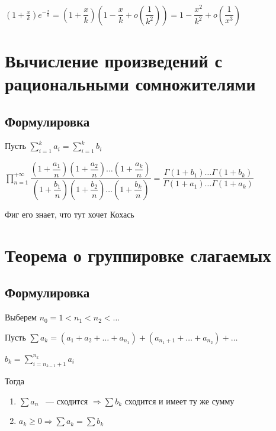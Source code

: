 \documentclass{article}
\begin{document}
            $\left(1 + \frac{x}{k} \right) e^{-\frac{x}{k}} = \left(1 + \dfrac{x}{k} \right) \left( 1 - \dfrac{x}{k} + o \left(\dfrac{1}{k^2} \right) \right) = 1 - \dfrac{x^2}{k^2} + o\left(\dfrac{1}{x^3} \right)$
            
    \newpage
    
    \section{Вычисление произведений с рациональными сомножителями}
    
        \subsection{Формулировка}
        
            Пусть $\sum\limits^k_{i = 1} a_i = \sum\limits^k_{i = 1} b_i$
            
            $\prod\limits^{+\infty}_{n = 1} \dfrac{\left( 1 + \dfrac{a_1}{n} \right) \left(1 + \dfrac{a_2}{n} \right) \ldots \left( 1 + \dfrac{a_k}{n} \right)}{\left (1 + \dfrac{b_1}{n} \right) \left(1 + \dfrac{b_2}{n} \right) \ldots \left(1 + \dfrac{b_k}{n} \right)} = \dfrac{\Gamma(1 + b_1) \ldots \Gamma(1 + b_k)}{\Gamma(1 + a_1) \ldots \Gamma(1 + a_k)}$
            
            Фиг его знает, что тут хочет Кохась
            
    \newpage
    
    \section{Теорема о группировке слагаемых}
    
        \subsection{Формулировка}
        
            Выберем $n_0 = 1 < n_1 < n_2 < \ldots$
            
            Пусть $\sum a_k = (a_1 + a_2 + \ldots + a_{n_1}) + (a_{n_1 + 1} + \ldots + a_{n_2}) + \ldots$
            
            $b_k = \sum\limits^{n_k}_{i = n_{k - 1} + 1} a_i$
            
            Тогда
            
            \begin{enumerate}
            
                \item $\sum a_n$ ~--- сходится $\Rightarrow \sum b_k$ сходится и имеет ту же сумму
                
                \item $a_k \geq 0 \Rightarrow \sum a_k = \sum b_k$ 
                
            \end{enumerate}
            
\end{document}
